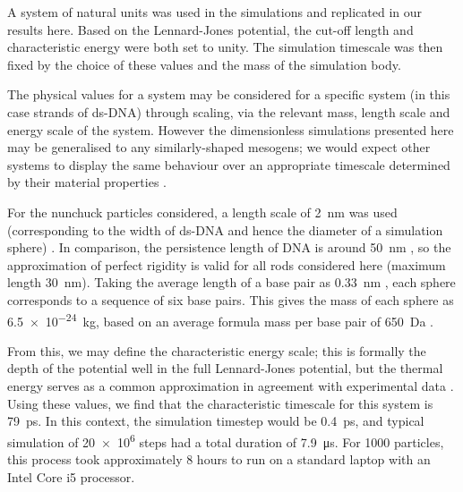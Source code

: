 \documentclass[11pt, a4paper]{article} %
\begin{document}
A system of natural units was used in the simulations and replicated in our results here. Based on the Lennard-Jones potential, the cut-off length and characteristic energy were both set to unity. The simulation timescale was then fixed by the choice of these values and the mass of the simulation body. 

The physical values for a system may be considered for a specific system (in this case strands of ds-DNA) through scaling, via the relevant mass, length scale and energy scale of the system. However the dimensionless simulations presented here may be generalised to any similarly-shaped mesogens; we would expect other systems to display the same behaviour over an appropriate timescale determined by their material properties \cite{Rapaport2004}.

For the nunchuck particles considered, a length scale of \SI{2}{\nano\metre} was used (corresponding to the width of ds-DNA and hence the diameter of a simulation sphere) \cite{Arnott1972}. In comparison, the persistence length of DNA is around \SI{50}{\nano\metre} \cite{Garcia2007}, so the approximation of perfect rigidity is valid for all rods considered here (maximum length \SI{30}{\nano\metre}). Taking the average length of a base pair as \SI{0.33}{\nano\metre} \cite{Langridge1960}, each sphere corresponds to a sequence of six base pairs. This gives the mass of each sphere as \SI{6.5e-24}{\kilogram}, based on an average formula mass per base pair of \SI{650}{\dalton} \cite{Duewer2018}. 

From this, we may define the characteristic energy scale; this is formally the depth of the potential well in the full Lennard-Jones potential, but the thermal energy serves as a common approximation \cite{Pan2010} in agreement with experimental data \cite{Wang2002}. Using these values, we find that the characteristic timescale for this system is \SI{79}{\pico\second}. In this context, the simulation timestep would be \SI{0.4}{\pico\second}, and typical simulation of \num{20e6} steps had a total duration of \SI{7.9}{\micro\second}. For \num{1000} particles, this process took approximately $8$ hours to run on a standard laptop with an Intel Core i5 processor. %
\end{document}
